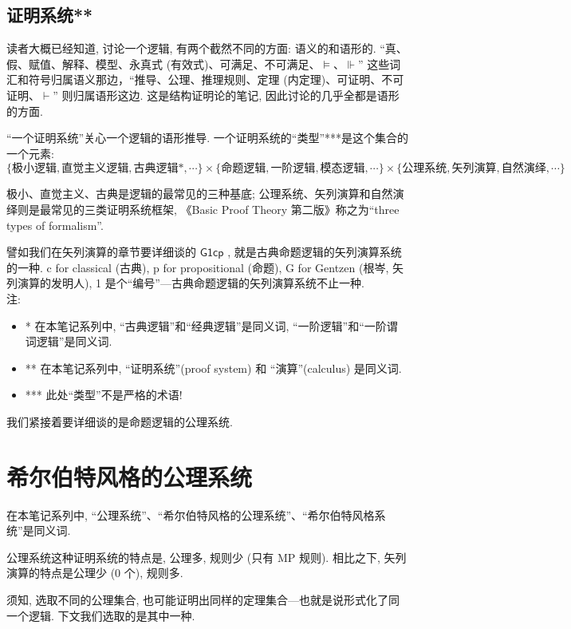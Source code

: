 \documentclass{article}
\def\Gonecp{$ \mathsf{G1cp} $ }
\begin{document}
\subsection{证明系统**}

读者大概已经知道, 讨论一个逻辑, 有两个截然不同的方面: 语义的和语形的. ``真、假、赋值、解释、模型、永真式 (有效式)、可满足、不可满足、$\models$、$\Vdash$'' 这些词汇和符号归属语义那边，``推导、公理、推理规则、定理 (内定理)、可证明、不可证明、$\vdash$'' 则归属语形这边. 这是结构证明论的笔记, 因此讨论的几乎全都是语形的方面.

``一个证明系统''关心一个逻辑的语形推导. 一个证明系统的``类型''***是这个集合的一个元素:
$$
\{\text{极小逻辑}, \text{直觉主义逻辑}, \text{古典逻辑*}, \cdots\} \times \{\text{命题逻辑}, \text{一阶逻辑}, \text{模态逻辑}, \cdots\} \times \{\text{公理系统}, \text{矢列演算}, \text{自然演绎}, \cdots\}
$$

极小、直觉主义、古典是逻辑的最常见的三种基底; 公理系统、矢列演算和自然演绎则是最常见的三类证明系统框架, 《Basic Proof Theory 第二版》称之为``three types of formalism''.

譬如我们在矢列演算的章节要详细谈的 \Gonecp, 就是古典命题逻辑的矢列演算系统的一种. c for classical (古典), p for propositional (命题), G for Gentzen (根岑, 矢列演算的发明人), 1 是个``编号''---古典命题逻辑的矢列演算系统不止一种.\\

注:
\begin{itemize}
	\item * 在本笔记系列中, ``古典逻辑''和``经典逻辑''是同义词, ``一阶逻辑''和``一阶谓词逻辑''是同义词.
	\item ** 在本笔记系列中, ``证明系统''(proof system) 和 ``演算''(calculus) 是同义词.
	\item *** 此处``类型''不是严格的术语!
\end{itemize}

我们紧接着要详细谈的是命题逻辑的公理系统.


\section{希尔伯特风格的公理系统}

在本笔记系列中, ``公理系统''、``希尔伯特风格的公理系统''、``希尔伯特风格系统''是同义词.

公理系统这种证明系统的特点是, 公理多, 规则少 (只有 MP 规则). 相比之下, 矢列演算的特点是公理少 (0 个), 规则多.

须知, 选取不同的公理集合, 也可能证明出同样的定理集合---也就是说形式化了同一个逻辑. 下文我们选取的是其中一种.
\end{document}
